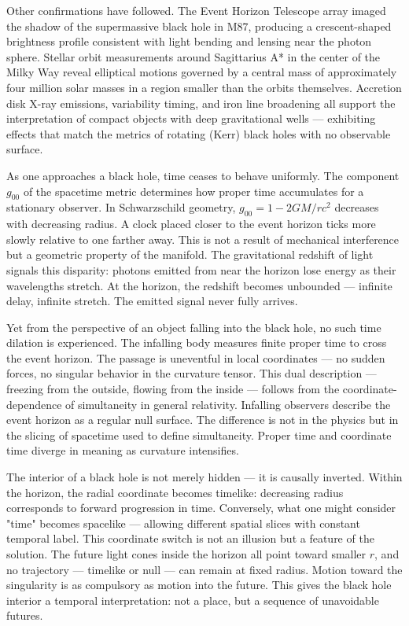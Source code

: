 Other confirmations have followed. The Event Horizon Telescope array imaged the shadow of the supermassive black hole in M87, producing a crescent-shaped brightness profile consistent with light bending and lensing near the photon sphere. Stellar orbit measurements around Sagittarius A* in the center of the Milky Way reveal elliptical motions governed by a central mass of approximately four million solar masses in a region smaller than the orbits themselves. Accretion disk X-ray emissions, variability timing, and iron line broadening all support the interpretation of compact objects with deep gravitational wells — exhibiting effects that match the metrics of rotating (Kerr) black holes with no observable surface.


As one approaches a black hole, time ceases to behave uniformly. The component $g_{00}$ of the spacetime metric determines how proper time accumulates for a stationary observer. In Schwarzschild geometry, $g_{00} = 1 - 2GM/rc^2$ decreases with decreasing radius. A clock placed closer to the event horizon ticks more slowly relative to one farther away. This is not a result of mechanical interference but a geometric property of the manifold. The gravitational redshift of light signals this disparity: photons emitted from near the horizon lose energy as their wavelengths stretch. At the horizon, the redshift becomes unbounded — infinite delay, infinite stretch. The emitted signal never fully arrives.


Yet from the perspective of an object falling into the black hole, no such time dilation is experienced. The infalling body measures finite proper time to cross the event horizon. The passage is uneventful in local coordinates — no sudden forces, no singular behavior in the curvature tensor. This dual description — freezing from the outside, flowing from the inside — follows from the coordinate-dependence of simultaneity in general relativity. Infalling observers describe the event horizon as a regular null surface. The difference is not in the physics but in the slicing of spacetime used to define simultaneity. Proper time and coordinate time diverge in meaning as curvature intensifies.


The interior of a black hole is not merely hidden — it is causally inverted. Within the horizon, the radial coordinate becomes timelike: decreasing radius corresponds to forward progression in time. Conversely, what one might consider "time" becomes spacelike — allowing different spatial slices with constant temporal label. This coordinate switch is not an illusion but a feature of the solution. The future light cones inside the horizon all point toward smaller $r$, and no trajectory — timelike or null — can remain at fixed radius. Motion toward the singularity is as compulsory as motion into the future. This gives the black hole interior a temporal interpretation: not a place, but a sequence of unavoidable futures.


